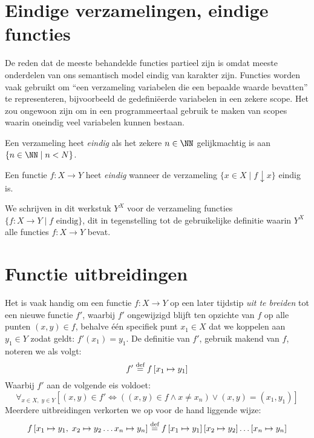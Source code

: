\section{Eindige verzamelingen, eindige functies}

De reden dat de meeste behandelde functies partieel zijn is omdat meeste onderdelen van ons semantisch model eindig van karakter zijn. Functies worden vaak gebruikt om “een verzameling variabelen die een bepaalde waarde bevatten” te representeren, bijvoorbeeld de gedefiniëerde variabelen in een zekere scope. Het zou ongewoon zijn om in een programmeertaal gebruik te maken van scopes waarin oneindig veel variabelen kunnen bestaan.

Een verzameling heet \emph{eindig} als het zekere $n \in \NN$ gelijkmachtig is aan $\{n \in \NN \mid n < N\}$.

Een functie $f: X \to Y$ heet \emph{eindig} wanneer de verzameling $\{x \in X \mid f \downarrow x\}$ eindig is.

We schrijven in dit werkstuk $Y^X$ voor de verzameling functies $\{f : X \to Y \mid f \text{ eindig} \}$, dit in tegenstelling tot de gebruikelijke definitie waarin $Y^X$ alle functies $f : X \to Y$ bevat.

\section{Functie uitbreidingen}
\label{sec:uitbreiden}

Het is vaak handig om een functie $f : X \to Y$ op een later tijdstip \emph{uit te breiden} tot een nieuwe functie $f'$, waarbij $f'$ ongewijzigd blijft ten opzichte van $f$ op alle punten $(x, y) \in f$, behalve één specifiek punt $x_1 \in X$ dat we koppelen aan $y_1 \in Y$ zodat geldt: $f'(x_1) = y_1$. De definitie van $f'$, gebruik makend van $f$, noteren we als volgt:
%
\begin{equation*}
  f' \DEF f \left[ x_1 \mapsto y_1 \right]
\end{equation*}
%
Waarbij $f'$ aan de volgende eis voldoet:
%
\begin{equation*}
  \forall_{x \in X,\; y \in Y} \left[ (x, y) \in f' \Leftrightarrow \left( (x, y) \in f \land x \neq x_n \right) \lor (x, y) = (x_1, y_1) \right]
\end{equation*}
%
Meerdere uitbreidingen verkorten we op voor de hand liggende wijze:
%
\begin{equation*}
  f \left[ x_1 \mapsto y_1,\; x_2 \mapsto y_2 \dots x_n \mapsto y_n \right]
  \DEF
  f \left[ x_1 \mapsto y_1 \right]
    \left[ x_2 \mapsto y_2 \right]\dots
    \left[ x_n \mapsto y_n \right]
\end{equation*}

